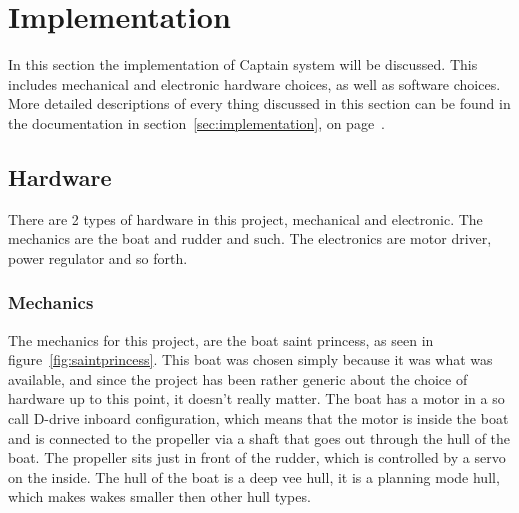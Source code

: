 \chapter{Implementation}
In this section the implementation of Captain system will be discussed. This includes mechanical and electronic hardware choices, as well as software choices.
More detailed descriptions of every thing discussed in this section can be found in the documentation in section~\ref{sec:implementation}, on page~\pageref{sec:implementation}.

\section{Hardware}
There are 2 types of hardware in this project, mechanical and electronic. The mechanics are the boat and rudder and such. The electronics are motor driver, power regulator and so forth.

\subsection{Mechanics}
The mechanics for this project, are the boat saint princess, as seen in figure~\ref{fig:saintprincess}. This boat was chosen simply because it was what was available, and since the project has been rather generic about the choice of hardware up to this point, it doesn't really matter. The boat has a motor in a so call D-drive inboard configuration\cite{motor_config}, which means that the motor is inside the boat and is connected to the propeller via a shaft that goes out through the hull of the boat. The propeller sits just in front of the rudder, which is controlled by a servo on the inside. The hull of the boat is a deep vee hull\cite{hull-types}, it is a planning mode hull, which makes wakes smaller then other hull types.

